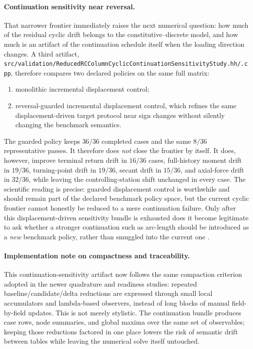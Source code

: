 \paragraph{Continuation sensitivity near reversal.}
That narrower frontier immediately raises the next numerical question: how
much of the residual cyclic drift belongs to the constitutive--discrete model,
and how much is an artifact of the continuation schedule itself when the
loading direction changes. A third artifact,
\texttt{src/validation/ReducedRCColumnCyclicContinuationSensitivityStudy.hh/.cpp},
therefore compares two declared policies on the same full matrix:
\begin{enumerate}
  \item monolithic incremental displacement control;
  \item reversal-guarded incremental displacement control, which refines the
        same displacement-driven target protocol near sign changes without
        silently changing the benchmark semantics.
\end{enumerate}
The guarded policy keeps \(36/36\) completed cases and the same
\(8/36\) representative passes. It therefore does \emph{not} close the
frontier by itself. It does, however, improve terminal return drift in
\(16/36\) cases, full-history moment drift in \(19/36\), turning-point drift
in \(19/36\), secant drift in \(15/36\), and axial-force drift in \(32/36\),
while leaving the controlling-station shift unchanged in every case. The
scientific reading is precise: guarded displacement control is worthwhile and
should remain part of the declared benchmark policy space, but the current
cyclic frontier cannot honestly be reduced to a mere continuation failure.
Only after this displacement-driven sensitivity bundle is exhausted does it
become legitimate to ask whether a stronger continuation such as arc-length
should be introduced as a \emph{new} benchmark policy, rather than smuggled
into the current one \cite{Crisfield1991_NLFEA_Vol1}.

\paragraph{Implementation note on compactness and traceability.}
This continuation-sensitivity artifact now follows the same compaction
criterion adopted in the newer quadrature and readiness studies: repeated
baseline/candidate/delta reductions are expressed through small local
accumulators and lambda-based observers, instead of long blocks of manual
field-by-field updates. This is not merely stylistic. The continuation bundle
produces case rows, node summaries, and global maxima over the same set of
observables; keeping those reductions factored in one place lowers the risk of
semantic drift between tables while leaving the numerical solve itself
untouched.

